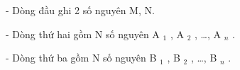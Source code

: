 - Dòng đầu ghi 2 số nguyên M, N.  

   - Dòng thứ hai gồm N số nguyên A   $_    1   $   , A   $_    2   $   , …, A   $_    n   $   .  

   - Dòng thứ ba gồm N số nguyên B   $_    1   $   , B   $_    2   $   , …, B   $_    n   $   .